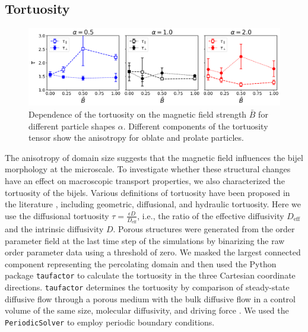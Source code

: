 \subsection{Tortuosity}

\begin{figure}
\centering
\includegraphics[width=\textwidth]{figures/results/paper1/tortuosity_compare.png}
\caption{Dependence of the tortuosity on the magnetic field strength $\bar{B}$ for different particle shapes $\alpha$. Different components of the tortuosity tensor show the anisotropy for oblate and prolate particles.}
\label{fig:tau_B}
\end{figure}

The anisotropy of domain size suggests that the magnetic field
influences the bijel morphology at the microscale. To investigate
whether these structural changes have an effect on macroscopic
transport properties, we also characterized the tortuosity of the
bijels. Various definitions of tortuosity have been proposed in the
literature \cite{dasilva_tortuosity_2022}, including geometric,
diffusional, and hydraulic tortuosity. Here we use the diffusional
tortuosity $\tau= \frac{\epsilon D}{D_{\text{eff}}}$, i.e., the ratio of the 
effective diffusivity $D_{\text{eff}}$ and the intrinsic diffusivity
$D$. Porous structures were generated from the order parameter field
at the last time step of the simulations by binarizing the raw order
parameter data using a threshold of zero. We masked the largest
connected component representing the percolating domain and then used
the Python package \texttt{taufactor}\cite{cooper_taufactor_2016} to
calculate the tortuosity in the three Cartesian coordinate
directions. \texttt{taufactor} determines the tortuosity by comparison
of steady-state diffusive flow through a porous medium with the bulk
diffusive flow in a control volume of the same size, molecular
diffusivity, and driving force \cite{cooper_taufactor_2016}. We used
the \texttt{PeriodicSolver} to employ periodic boundary conditions.

